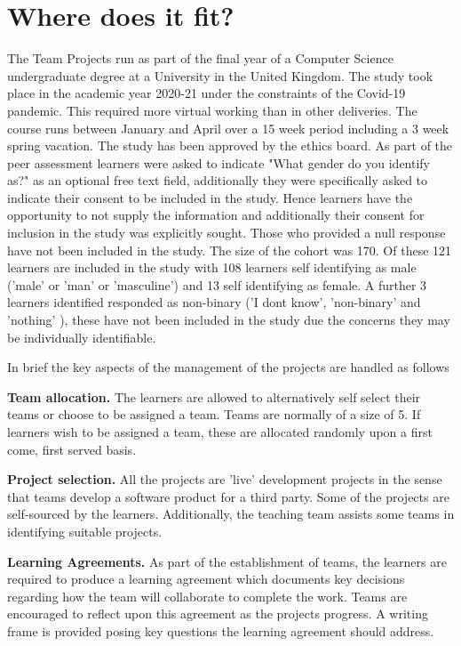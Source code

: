 \documentclass[sigconf, anonymous=true]{acmart}
\begin{document}
\section{Where does it fit?}
The Team Projects run as part of the final year of a Computer Science undergraduate degree at a University in the United Kingdom. The study took place in the academic year 2020-21 under the constraints of the Covid-19 pandemic. This required more virtual working than in other deliveries. The course runs between January and April over a 15 week period including a 3 week spring vacation. The study has been approved by the ethics board.  As part of the peer assessment learners were asked to indicate "What gender do you identify as?" as an optional free text field, additionally they were specifically asked to indicate their consent to be included in the study. Hence learners have the opportunity to not supply the information and additionally their consent for inclusion in the study was explicitly sought. Those who provided a null response have not been included in the study. The size of the cohort was 170. Of these 121 learners are included in the study with 108 learners self identifying as male ('male' or 'man' or 'masculine') and 13 self identifying as female. A further 3 learners identified responded as non-binary ('I dont know', 'non-binary' and 'nothing' ), these have not been included in the study due the concerns they may be individually identifiable.

In brief the key aspects of the management of the projects are handled as follows

    \textbf{Team allocation.}
The learners are allowed to alternatively self select their teams or choose to be assigned a team. Teams are normally of a size of 5. If learners wish to be assigned a team, these are allocated randomly upon a first come, first served basis. 

\textbf {Project selection.}
All the projects are 'live' development projects in the sense that teams develop a software product for a third party. Some of the projects are self-sourced by the learners. Additionally, the teaching team assists some teams in identifying suitable projects. 

\textbf{Learning Agreements.}
As part of the establishment of teams, the learners are required to produce a learning agreement which documents key decisions regarding how the team will collaborate to complete the work. Teams are encouraged to reflect upon this agreement as the projects progress. A writing frame is provided posing key questions the learning agreement should address. 
\end{document}
